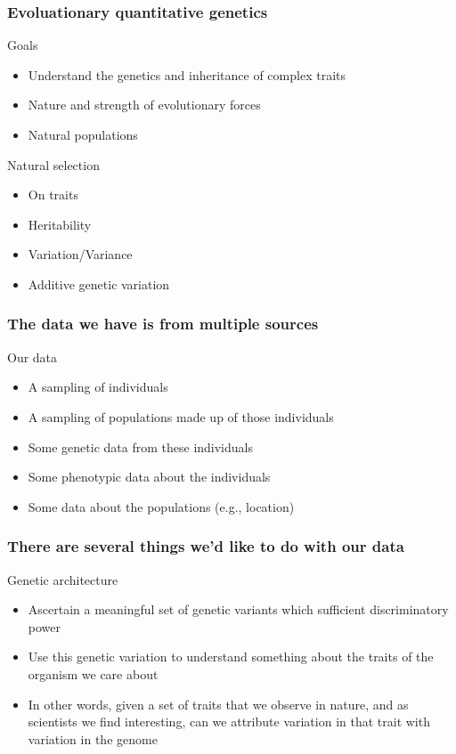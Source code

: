 \begin{frame}
\frametitle{Evoluationary quantitative genetics \citep{Walsh:2008}}
\begin{block}{Goals}
\begin{itemize}
\item{Understand the genetics and inheritance of complex traits}
\item{Nature and strength of evolutionary forces}
\item{Natural populations}
\end{itemize}
\end{block}


\begin{block}{Natural selection}
\begin{itemize}
\item{On traits}
\item{Heritability}
\item{Variation/Variance}
\item{Additive genetic variation}
\end{itemize}
\end{block}
\end{frame}

\begin{frame}
\frametitle{The data we have is from multiple sources}
\begin{block}{Our data}
\begin{itemize}
\item{A sampling of individuals}
\item{A sampling of populations made up of those individuals}
\item{Some genetic data from these individuals}
\item{Some phenotypic data about the individuals}
\item{Some data about the populations (e.g., location)}
\end{itemize}

\end{block}\end{frame}

\begin{frame}
\frametitle{There are several things we'd like to do with our data}

\begin{block}{Genetic architecture}
\begin{itemize}
\item{Ascertain a meaningful set of genetic variants which sufficient
discriminatory power}
\item{Use this genetic variation to understand something about the 
traits of the organism we care about}
\item{In other words, given a set of traits that we observe in nature, and as
scientists we find interesting, can we attribute variation in that trait with
variation in the genome}
\end{itemize}
\end{block}
\end{frame}



